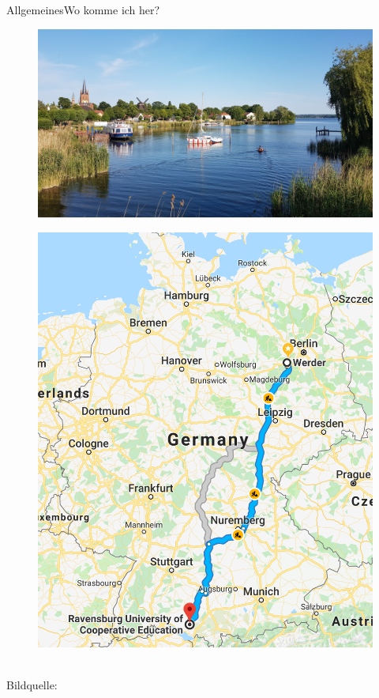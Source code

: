 \begin{frame}{Allgemeines}{Wo komme ich her?}
	\begin{minipage}{0.7\textwidth}
	\centering
		\begin{figure}
		\centering
		\includegraphics[width=.95\linewidth]{graph/werder.jpg}
	\end{figure}
	\end{minipage}%
	\begin{minipage}{0.3\textwidth}
	\centering
		\begin{figure}
		\centering
		\includegraphics[width=.95\linewidth]{graph/route2werder.png}
		\end{figure}
	\end{minipage}
	\\
	\tiny{Bildquelle: \cite{pic:werder}}
\end{frame}

